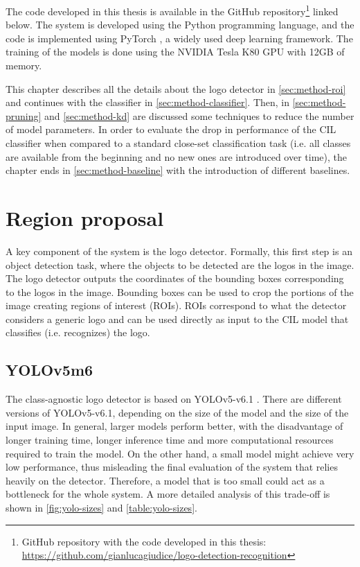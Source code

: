The code developed in this thesis is available in the GitHub repository\footnote{GitHub repository with the code developed in this thesis: \\ \href{https://github.com/gianlucagiudice/logo-detection-recognition}{https://github.com/gianlucagiudice/logo-detection-recognition}} linked below. The system is developed using the Python programming language, and the code is implemented using PyTorch \cite{paszke2019pytorch}, a widely used deep learning framework. The training of the models is done using the NVIDIA Tesla K80 GPU with 12GB of memory.

\vspace{1.5\baselineskip}
This chapter describes all the details about the logo detector in \autoref{sec:method-roi} and continues with the classifier in \autoref{sec:method-classifier}. Then, in \autoref{sec:method-pruning} and \autoref{sec:method-kd} are discussed some techniques to reduce the number of model parameters. In order to evaluate the drop in performance of the CIL classifier when compared to a standard close-set classification task (i.e. all classes are available from the beginning and no new ones are introduced over time),
the chapter ends in \autoref{sec:method-baseline} with the introduction of different baselines.

\section{Region proposal}
A key component of the system is the logo detector. Formally, this first step is an object detection task, where the objects to be detected are the logos in the image. The logo detector outputs the coordinates of the bounding boxes corresponding to the logos in the image.
Bounding boxes can be used to crop the portions of the image creating regions of interest (ROIs).
ROIs correspond to what the detector considers a generic logo and can be used directly as input to the CIL model that classifies (i.e. recognizes) the logo.

\label{sec:method-roi}
\subsection{YOLOv5m6}
The class-agnostic logo detector is based on YOLOv5-v6.1 \cite{glenn_jocher_2021_5563715}.
There are different versions of YOLOv5-v6.1, depending on the size of the model and the size of the input image.
In general, larger models perform better, with the disadvantage of longer training time, longer inference time and more computational resources required to train the model.
On the other hand, a small model might achieve very low performance, thus misleading the final evaluation of the system that relies heavily on the detector.
Therefore, a model that is too small could act as a bottleneck for the whole system. A more detailed analysis of this trade-off is shown in \autoref{fig:yolo-sizes} and \autoref{table:yolo-sizes}.

